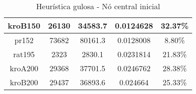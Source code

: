 \documentclass[10pt]{extarticle} %
\begin{document}
\begin{table}[h]
\begin{tabular}{|c|c|c|c|c|}
        kroB150           & 26130          & 34583.7        & 0.0124628        & 32.37\%        \\ \hline
        pr152             & 73682          & 80161.3        & 0.0128008        & 8.80\%         \\ \hline
        rat195            & 2323           & 2830.1         & 0.0231814        & 21.83\%        \\ \hline
        kroA200           & 29368          & 37701.5        & 0.0246762        & 28.38\%        \\ \hline
        kroB200           & 29437          & 36893.6        & 0.024664         & 25.33\%        \\ \hline
    \end{tabular}
    \caption{Heurística gulosa - Nó central inicial}
    \label{tab:my_label}
\end{table}
\end{document}
